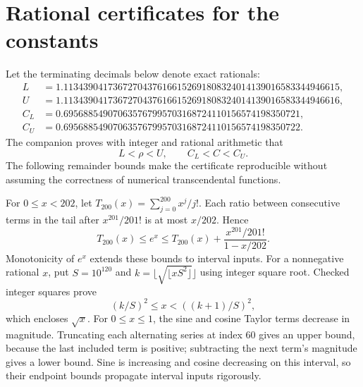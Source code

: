 \documentclass[11pt,letterpaper]{article}
\numberwithin{equation}{section}
\theoremstyle{remark}\newtheorem{remark}[theorem]{Remark}
\begin{document}
\section{Rational certificates for the constants}\label{psp:egf:sec:certificate}
Let the terminating decimals below denote exact rationals:
\begin{align*}
 L&=1.11343904173672704376166152691808324014139016583344946615,\\
 U&=1.11343904173672704376166152691808324014139016583344946616,\\
 C_L&=0.695688549070635767995703168724110156574198350721,\\
 C_U&=0.695688549070635767995703168724110156574198350722.
\end{align*}
The companion proves with integer and rational arithmetic that
\begin{equation}\label{psp:egf:eq:brackets}
 L<\rho<U,\qquad C_L<C<C_U.
\end{equation}
The following remainder bounds make the certificate reproducible without
assuming the correctness of numerical transcendental functions.

For $0\leq x<202$, let $T_{200}(x)=\sum_{j=0}^{200}x^j/j!$. Each ratio
between consecutive terms in the tail after $x^{201}/201!$ is at most
$x/202$. Hence
\begin{equation}\label{psp:egf:eq:expbound}
 T_{200}(x)\leq e^x\leq T_{200}(x)+
 \frac{x^{201}/201!}{1-x/202}.
\end{equation}
Monotonicity of $e^x$ extends these bounds to interval inputs.
For a nonnegative rational $x$, put $S=10^{120}$ and
$k=\lfloor\sqrt{\lfloor xS^2\rfloor}\rfloor$ using integer square root.
Checked integer squares prove
\[
 (k/S)^2\leq x<((k+1)/S)^2,
\]
which encloses $\sqrt x$. For $0\leq x\leq1$, the sine and cosine Taylor
terms decrease in magnitude. Truncating each alternating series at index
60 gives an upper bound, because the last included term is positive;
subtracting the next term's magnitude gives a lower bound. Sine is
increasing and cosine decreasing on this interval, so their endpoint
bounds propagate interval inputs rigorously.
\end{document}

